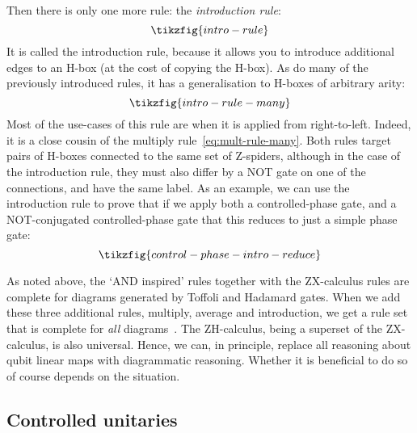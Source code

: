 \documentclass[a4paper,onecolumn,superscriptaddress,11pt,%
				unpublished,%
				allowfontchageintitle,%
				]{quantumarticle}
\begin{document}
Then there is only one more rule: the \emph{introduction rule}:
\begin{equation}\label{eq:intro-rule}
	\tikzfig{intro-rule}
\end{equation}
It is called the introduction rule, because it allows you to introduce additional edges to an H-box (at the cost of copying the H-box). As do many of the previously introduced rules, it has a generalisation to H-boxes of arbitrary arity:
\begin{equation}\label{eq:intro-rule-many}
	\tikzfig{intro-rule-many}
\end{equation}
Most of the use-cases of this rule are when it is applied from right-to-left. Indeed, it is a close cousin of the multiply rule~\eqref{eq:mult-rule-many}. Both rules target pairs of H-boxes connected to the same set of Z-spiders, although in the case of the introduction rule, they must also differ by a NOT gate on one of the connections, and have the same label.
As an example, we can use the introduction rule to prove that if we apply both a controlled-phase gate, and a NOT-conjugated controlled-phase gate that this reduces to just a simple phase gate:
\begin{equation}
	\tikzfig{control-phase-intro-reduce}
\end{equation}

As noted above, the `AND inspired' rules together with the ZX-calculus rules are complete for diagrams generated by Toffoli and Hadamard gates. When we add these three additional rules, multiply, average and introduction, we get a rule set that is complete for \emph{all} diagrams~\cite{backens2018zhcalculus}. The ZH-calculus, being a superset of the ZX-calculus, is also universal. Hence, we can, in principle, replace all reasoning about qubit linear maps with diagrammatic reasoning.
Whether it is beneficial to do so of course depends on the situation.

\subsection{Controlled unitaries}\label{sec:controlled-unitaries}
\end{document}
